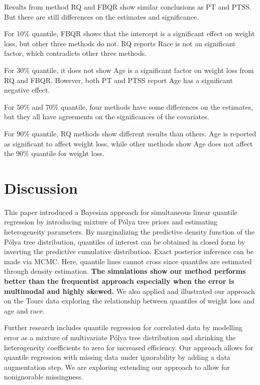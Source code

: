 \documentclass[12pt]{article}
\newcommand{\polya}{P\'{o}lya}
\begin{document}
Results from method RQ and FBQR show similar conclusions as PT and
PTSS.  But there are still differences on the estimates and
significance.

For 10\% quantile, FBQR shows that the intercept is a significant
effect on weight loss, but other three methods do not. RQ reports Race
is not an significant factor, which contradicts other three methods.

For 30\% quantile, it does not show Age is a significant factor on
weight loss from RQ and FBQR. However, both PT and PTSS report Age has
a significant negative effect.

For 50\% and 70\% quantile, four methods have some differences on the
estimates, but they all have agreements on the significances of the
covariates.

For 90\% quantile, RQ methods show different results than others. Age
is reported as significant to affect weight loss, while other methods
show Age does not affect the 90\% quantile for weight loss.

\section{Discussion}
\label{sec:discussion}
This paper introduced a Bayesian approach for simultaneous linear quantile
regression by introducing mixture of \polya{}
tree priors and estimating heterogeneity parameters. By marginalizing
the predictive density function of the \polya{} tree distribution,
quantiles of interest can be obtained in closed form by inverting the
predictive cumulative distribution. Exact posterior inference can
be made via MCMC. Here, quantile lines cannot cross since quantiles
are estimated through density estimation.  {\bf The simulations show our
method performs better than the frequentist approach especially when
the error is multimodal and highly skewed. }  We also applied and
illustrated our approach on the Tours data exploring the relationship
between quantiles of weight loss and age and race.

Further research includes quantile regression for correlated data by
modelling error as a mixture of multivariate \polya{} tree
distribution and shrinking the heterogeneity coefficients to zero for
increased efficiency.
Our approach allows for quantile regression with missing
data under ignorability by adding a data augmentation step.  We are
exploring extending our approach to allow for nonignorable
missingness.



\end{document}
